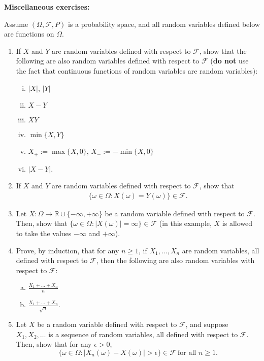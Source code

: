 \documentclass[11pt]{article}
\begin{document}
\par \textbf{Miscellaneous exercises:} 
\par
Assume $(\Omega,\mathcal{F},P)$ is a probability space, and all random variables defined below are functions on $\Omega$.
\begin{enumerate}
	\item If $X$ and $Y$ are random variables defined with respect to $\mathcal{F}$, show that the following are also random variables defined with respect to $\mathcal{F}$ (\textbf{do not} use the fact that continuous functions of random variables are random variables):
	\begin{enumerate}[(i)]
	    \item $|X|$, $|Y|$
		\item $X-Y$
		\item $XY$
		\item $\min\{X,Y\}$
		\item $X_{+}:=\max\{X,0\}$, $X_{-}:=-\min\{X,0\}$
		\item $|X-Y|$.
	\end{enumerate}

    \item If $X$ and $Y$ are random variables defined with respect to $\mathcal{F}$, show that 
    \begin{eqnarray}
    \{\omega\in \Omega:X(\omega)=Y(\omega)\}\in \mathcal{F}.\nonumber
    \end{eqnarray}
    \item Let $X:\Omega\to \mathbb{R}\cup \{-\infty,+\infty\}$ be a random variable defined with respect to $\mathcal{F}$. Then, show that $\{\omega\in \Omega:|X(\omega)|=\infty\}\in \mathcal{F}$ (in this example, $X$ is allowed to take the values $-\infty$ and $+\infty$).
    \item Prove, by induction, that for any $n\geq 1$, if $X_{1},\ldots,X_{n}$ are random variables, all defined with respect to $\mathcal{F}$, then the following are also random variables with respect to $\mathcal{F}$:
    \begin{enumerate}[(a)]
    	\item $\frac{X_{1}+\ldots+X_{n}}{n}$
    	\item $\frac{X_{1}+\ldots+X_{n}}{\sqrt{n}}$.
    \end{enumerate}
    \item Let $X$ be a random variable defined with respect to $\mathcal{F}$, and suppose $X_{1},X_{2},\ldots$ is a sequence of random variables, all defined with respect to $\mathcal{F}$. Then, show that for any $\epsilon>0$,
    \begin{equation}
    \{\omega\in \Omega:|X_{n}(\omega)-X(\omega)|>\epsilon\}\in \mathcal{F}~\text{for all }n\geq 1\nonumber.
    \end{equation} 
\end{enumerate}
\end{document}
